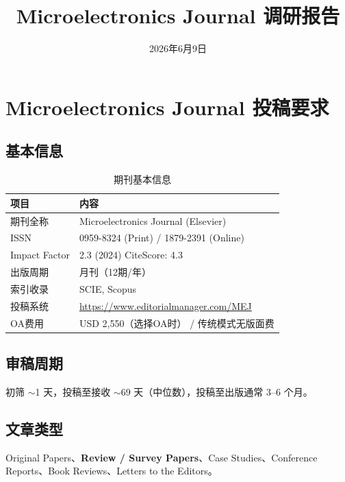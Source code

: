 \documentclass[11pt,a4paper]{article}
\title{\bfseries\large Microelectronics Journal 调研报告}
\author{}
\date{\small 2026年6月9日}
\begin{document}
\maketitle

\section{Microelectronics Journal 投稿要求}

\subsection{基本信息}

\begin{table}[!htbp]
\centering
\small
\begin{tabular}{ll}
\toprule
\textbf{项目} & \textbf{内容} \\
\midrule
期刊全称 & Microelectronics Journal (Elsevier) \\
ISSN & 0959-8324 (Print) / 1879-2391 (Online) \\
Impact Factor & 2.3 (2024) \quad CiteScore: 4.3 \\
出版周期 & 月刊（12期/年） \\
索引收录 & SCIE, Scopus \\
投稿系统 & \url{https://www.editorialmanager.com/MEJ} \\
OA费用 & USD 2,550（选择OA时） / 传统模式无版面费 \\
\bottomrule
\end{tabular}
\caption{期刊基本信息}
\end{table}

\subsection{审稿周期}
\small
初筛 $\sim$1 天，投稿至接收 $\sim$69 天（中位数），投稿至出版通常 3--6 个月。

\subsection{文章类型}
\small
Original Papers、\textbf{Review / Survey Papers}、Case Studies、Conference Reports、Book Reviews、Letters to the Editors。
\end{document}
